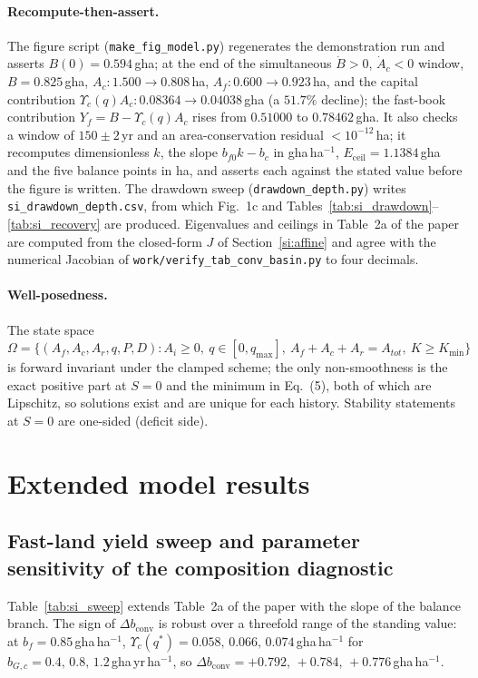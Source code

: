 \documentclass[11pt,a4paper]{article}
\newcommand{\dconv}{\Delta b_{\mathrm{conv}}}
\newcommand{\Ups}{\Upsilon_c}
\newcommand{\Eceil}{E_{\mathrm{ceil}}}
\begin{document}
\paragraph{Recompute-then-assert.} The figure script (\texttt{make\_fig\_model.py}) regenerates the demonstration run and asserts $B(0)=0.594$\,gha; at the end of the simultaneous $\dot B>0$, $\dot A_c<0$ window, $B=0.825$\,gha, $A_c:1.500\to0.808$\,ha, $A_f:0.600\to0.923$\,ha, and the capital contribution $\Ups(q)A_c:0.08364\to0.04038$\,gha (a $51.7\%$ decline); the fast-book contribution $Y_f=B-\Ups(q)A_c$ rises from $0.51000$ to $0.78462$\,gha. It also checks a window of $150\pm2$\,yr and an area-conservation residual $<10^{-12}$\,ha; it recomputes dimensionless $k$, the slope $b_{f0}k-b_c$ in gha\,ha$^{-1}$, $\Eceil=1.1384$\,gha and the five balance points in ha, and asserts each against the stated value before the figure is written. The drawdown sweep (\texttt{drawdown\_depth.py}) writes \texttt{si\_drawdown\_depth.csv}, from which Fig.~1c and Tables~\ref{tab:si_drawdown}--\ref{tab:si_recovery} are produced. Eigenvalues and ceilings in Table~2a of the paper are computed from the closed-form $J$ of Section~\ref{si:affine} and agree with the numerical Jacobian of \texttt{work/verify\_tab\_conv\_basin.py} to four decimals.

\paragraph{Well-posedness.} The state space $\Omega=\{(A_f,A_c,A_r,q,P,D):A_i\ge0,\ q\in[0,q_{\max}],\ A_f+A_c+A_r=A_{tot},\ K\ge K_{\min}\}$ is forward invariant under the clamped scheme; the only non-smoothness is the exact positive part at $S=0$ and the minimum in Eq.~(5), both of which are Lipschitz, so solutions exist and are unique for each history. Stability statements at $S=0$ are one-sided (deficit side).

\section{Extended model results}\label{si:results}

\subsection{Fast-land yield sweep and parameter sensitivity of the composition diagnostic}\label{si:sweep}

Table~\ref{tab:si_sweep} extends Table~2a of the paper with the slope of the balance branch. The sign of $\dconv$ is robust over a threefold range of the standing value: at $b_f=0.85$\,gha\,ha$^{-1}$, $\Ups(q^*)=0.058,\,0.066,\,0.074$\,gha\,ha$^{-1}$ for $b_{G,c}=0.4,\,0.8,\,1.2$\,gha\,yr\,ha$^{-1}$, so $\dconv=+0.792,\,+0.784,\,+0.776$\,gha\,ha$^{-1}$.
\end{document}
